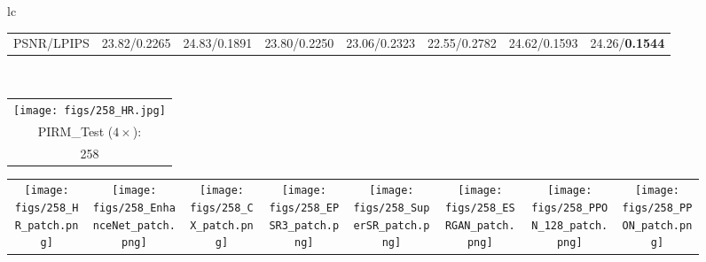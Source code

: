 \documentclass[preprint]{elsarticle}
\begin{document}
\begin{figure*}[htpb]
{\begin{tabular}{lc}
\begin{adjustbox}{valign=t}
\begin{tabular}{cccccccc}
					PSNR/LPIPS & \hspace{-3mm} 23.82/0.2265 & \hspace{-3mm} 24.83/0.1891 & \hspace{-3mm} 23.80/0.2250 &
					23.06/0.2323 & \hspace{-3mm} 22.55/0.2782 & \hspace{-3mm} 24.62/0.1593 & \hspace{-3mm} 24.26/\textbf{0.1544} \\
				\end{tabular}
			\end{adjustbox}
			\\
			\begin{adjustbox}{valign=t}
				\scriptsize
				\begin{tabular}{c}
					\texttt{[image: figs/258\_HR.jpg]} \\
					PIRM\_Test ($4 \times$): \\
					258 \\
				\end{tabular}
			\end{adjustbox}
			\hspace{-3mm}
			\begin{adjustbox}{valign=t}
				\scriptsize
				\begin{tabular}{cccccccc}
					\texttt{[image: figs/258\_HR\_patch.png]} &
					\hspace{-3mm}
					\texttt{[image: figs/258\_EnhanceNet\_patch.png]} &
					\hspace{-3mm}
					\texttt{[image: figs/258\_CX\_patch.png]} &
					\hspace{-3mm}
					\texttt{[image: figs/258\_EPSR3\_patch.png]} &
					\hspace{-3mm}					
					\texttt{[image: figs/258\_SuperSR\_patch.png]} &
					\hspace{-3mm}
					\texttt{[image: figs/258\_ESRGAN\_patch.png]} &
					\hspace{-3mm}
					\texttt{[image: figs/258\_PPON\_128\_patch.png]} &
					\hspace{-3mm}
					\texttt{[image: figs/258\_PPON\_patch.png]} \\
					

\end{tabular}
\end{adjustbox}
\end{tabular}}
\end{figure*}
\end{document}
